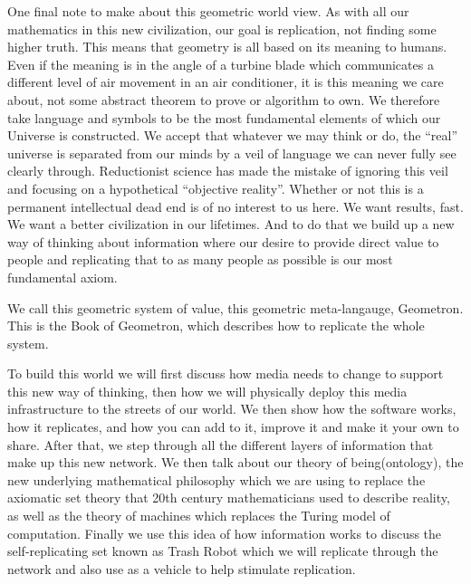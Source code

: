 One final note to make about this geometric world view.  As with all our mathematics in this new civilization, our goal is replication, not finding some higher truth.  This means that geometry is all based on its meaning to humans.  Even if the meaning is in the angle of a turbine blade which communicates a different level of air movement in an air conditioner, it is this meaning we care about, not some abstract theorem to prove or algorithm to own.  We therefore take language and symbols to be the most fundamental elements of which our Universe is constructed.  We accept that whatever we may think or do, the ``real'' universe is separated from our minds by a veil of language we can never fully see clearly through.  Reductionist science has made the mistake of ignoring this veil and focusing on a hypothetical ``objective reality''.  Whether or not this is a permanent intellectual dead end is of no interest to us here. We want results, fast. We want a better civilization in our lifetimes.  And to do that we build up a new way of thinking about information where our desire to provide direct value to people and replicating that to as many people as possible is our most fundamental axiom.

We call this geometric system of value, this geometric meta-langauge, Geometron.  This is the Book of Geometron, which describes how to replicate the whole system.

To build this world we will first discuss how media needs to change to support this new way of thinking, then how we will physically deploy this media infrastructure to the streets of our world.  We then show how the software works, how it replicates, and how you can add to it, improve it and make it your own to share.  After that, we step through all the different layers of information that make up this new network.  We then talk about our theory of being(ontology), the new underlying mathematical philosophy which we are using to replace the axiomatic set theory that 20th century mathematicians used to describe reality, as well as the theory of machines which replaces the Turing model of computation.  Finally we use this idea of how information works to discuss the self-replicating set known as Trash Robot which we will replicate through the network and also use as a vehicle to help stimulate replication.  

